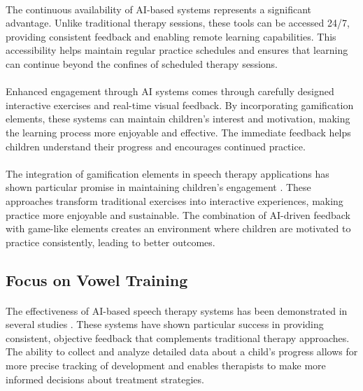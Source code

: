 \paragraph{}
The continuous availability of AI-based systems represents a significant advantage. Unlike traditional therapy sessions, these tools can be accessed 24/7, providing consistent feedback and enabling remote learning capabilities. This accessibility helps maintain regular practice schedules and ensures that learning can continue beyond the confines of scheduled therapy sessions.

\paragraph{}
Enhanced engagement through AI systems comes through carefully designed interactive exercises and real-time visual feedback. By incorporating gamification elements, these systems can maintain children's interest and motivation, making the learning process more enjoyable and effective. The immediate feedback helps children understand their progress and encourages continued practice.

\paragraph{}
The integration of gamification elements in speech therapy applications has shown particular promise in maintaining children's engagement \cite{child_engagement2023}. These approaches transform traditional exercises into interactive experiences, making practice more enjoyable and sustainable. The combination of AI-driven feedback with game-like elements creates an environment where children are motivated to practice consistently, leading to better outcomes.

\subsection{Focus on Vowel Training}
\label{subsec:vowel_focus}

\paragraph{}
The effectiveness of AI-based speech therapy systems has been demonstrated in several studies \cite{ai_speech2022}. These systems have shown particular success in providing consistent, objective feedback that complements traditional therapy approaches. The ability to collect and analyze detailed data about a child's progress allows for more precise tracking of development and enables therapists to make more informed decisions about treatment strategies.

